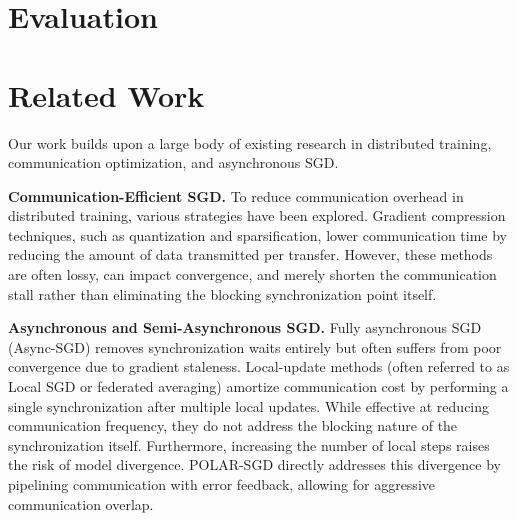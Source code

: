 \documentclass{article}
\theoremstyle{plain}
\theoremstyle{definition}
\theoremstyle{remark}
\begin{document}
        

    \section{Evaluation}
    \label{evaluation}

    

    \section{Related Work}
    \label{related-work}

    Our work builds upon a large body of existing research in distributed training, communication optimization, and asynchronous SGD.

    \textbf{Communication-Efficient SGD.} 
    To reduce communication overhead in distributed training, various strategies have been explored. Gradient compression techniques, such as quantization and sparsification, lower communication time by reducing the amount of data transmitted per transfer. However, these methods are often lossy, can impact convergence, and merely shorten the communication stall rather than eliminating the blocking synchronization point itself.

    \textbf{Asynchronous and Semi-Asynchronous SGD.} 
    Fully asynchronous SGD (Async-SGD) removes synchronization waits entirely but often suffers from poor convergence due to gradient staleness. Local-update methods (often referred to as Local SGD or federated averaging) amortize communication cost by performing a single synchronization after multiple local updates. While effective at reducing communication frequency, they do not address the blocking nature of the synchronization itself. Furthermore, increasing the number of local steps raises the risk of model divergence. POLAR-SGD directly addresses this divergence by pipelining communication with error feedback, allowing for aggressive communication overlap.
\end{document}
